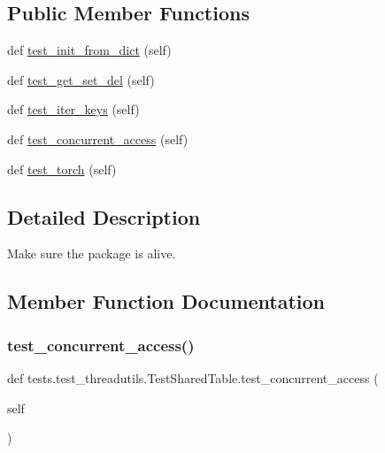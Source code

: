 \subsection*{Public Member Functions}
\begin{DoxyCompactItemize}
\item 
def \hyperlink{classtests_1_1test__threadutils_1_1TestSharedTable_a877c1284bd99fe9f44c4b744b4bae9d8}{test\+\_\+init\+\_\+from\+\_\+dict} (self)
\item 
def \hyperlink{classtests_1_1test__threadutils_1_1TestSharedTable_a5afcb2be145212a9d06f2f2ecd45da68}{test\+\_\+get\+\_\+set\+\_\+del} (self)
\item 
def \hyperlink{classtests_1_1test__threadutils_1_1TestSharedTable_ad83a5fe7bed1811264f41406c3ec8976}{test\+\_\+iter\+\_\+keys} (self)
\item 
def \hyperlink{classtests_1_1test__threadutils_1_1TestSharedTable_ad8ca4e7c8fbc4e8ddb170158fe01c861}{test\+\_\+concurrent\+\_\+access} (self)
\item 
def \hyperlink{classtests_1_1test__threadutils_1_1TestSharedTable_a44071985cd8526645fb0f2c41fddbff9}{test\+\_\+torch} (self)
\end{DoxyCompactItemize}


\subsection{Detailed Description}
\begin{DoxyVerb}Make sure the package is alive.
\end{DoxyVerb}
 

\subsection{Member Function Documentation}
\mbox{\label{classtests_1_1test__threadutils_1_1TestSharedTable_ad8ca4e7c8fbc4e8ddb170158fe01c861}} 
\subsubsection{\texorpdfstring{test\+\_\+concurrent\+\_\+access()}{test\_concurrent\_access()}}
{\footnotesize\ttfamily def tests.\+test\+\_\+threadutils.\+Test\+Shared\+Table.\+test\+\_\+concurrent\+\_\+access (\begin{DoxyParamCaption}\item[{}]{self }\end{DoxyParamCaption})}

